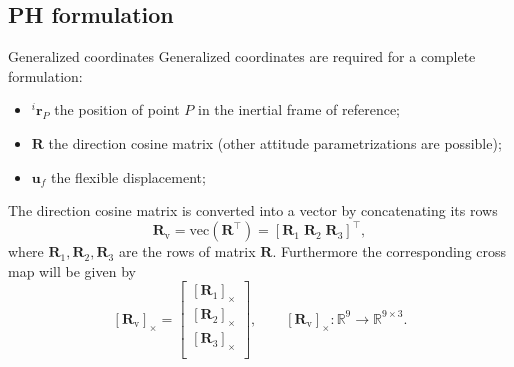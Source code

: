 \documentclass[aspectratio=169]{ISAE-Beamer}
\newcommand{\crmat}[1]{\ensuremath{[#1]_{\times}}}
\begin{document}
\subsection{PH formulation}

\begin{frame}{Generalized coordinates}
Generalized coordinates are required for a complete formulation:
\begin{itemize}
	\item $^i \bm{r}_P$ the position of point $P$ in the inertial frame of reference;
	\item $\bm{R}$ the direction cosine matrix (other attitude parametrizations are possible);
	\item $\bm{u}_f$ the flexible displacement;
\end{itemize}
The direction cosine matrix is converted into a vector by concatenating its rows
\begin{equation*}
\bm{R}_{\text{v}} = \text{vec}(\bm{R}^\top) = [\bm{R}_1 \; \bm{R}_2 \; \bm{R}_3]^\top,
\end{equation*}
where $\bm{R}_{1}, \bm{R}_{2}, \bm{R}_{3}$ are the rows of matrix $\bm{R}$. Furthermore the corresponding cross map will be given by
\begin{equation*}
\crmat{\bm{R}_{\text{v}}} = 
\begin{bmatrix}
\crmat{\bm{R}_1} \\
\crmat{\bm{R}_2} \\
\crmat{\bm{R}_3} \\
\end{bmatrix}, \qquad 
\crmat{\bm{R}_{\text{v}}} : \mathbb{R}^9 \rightarrow \mathbb{R}^{9 \times 3}.
\end{equation*}
\end{frame}
\end{document}
